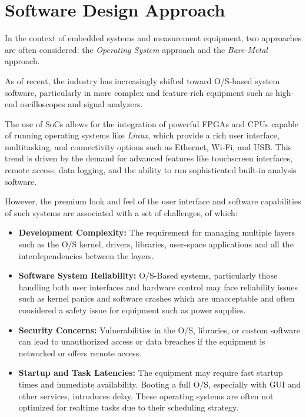 
\section{Software Design Approach}
\label{sec:software-design-approach}

In the context of embedded systems and measurement equipment, two
approaches are often considered: the \emph{Operating System} approach and the
\emph{Bare-Metal} approach.

As of recent, the industry has increasingly shifted toward \acs{O/S}-based
system software, particularly in more complex and feature-rich equipment
such as high-end oscilloscopes and signal analyzers.

The use of \acs{SoC}s allows for the integration of powerful \acs{FPGA}s and
\acs{CPU}s 
capable of running operating systems like \emph{Linux}, which provide a
rich user interface, multitasking, and connectivity
options such as Ethernet, Wi-Fi, and USB.
This trend is driven by the demand for advanced features like touchscreen
interfaces, remote access, data logging, and the ability to run sophisticated
built-in analysis software.

However, the premium look and feel of the user interface and software
capabilities of such systems are associated with a set of challenges, of which:

\begin{itemize}[topsep=8pt,itemsep=4pt,partopsep=4pt, parsep=4pt]
    \item \textbf{Development Complexity:}
    The requirement for managing multiple layers such as the
    \acs{O/S} kernel, drivers, libraries, user-space applications and
    all the interdependencies between the layers.

    \item \textbf{Software System Reliability:}
    \acs{O/S}-Based systems, particularly those handling both user interfaces
    and hardware control may face reliability issues such as kernel panics
    and software crashes which are unacceptable and often
    considered a safety issue for equipment such as power supplies.

    \item \textbf{Security Concerns:}
    Vulnerabilities in the \acs{O/S}, libraries, or custom software can lead to
    unauthorized access or data breaches if the equipment is networked or offers
    remote access.

    \item \textbf{Startup and Task Latencies:}
    The equipment may require fast startup times and immediate availability.
    Booting a full \acs{O/S}, especially with \acs{GUI} and other services,
    introduces delay.
    These operating systems are often not optimized for realtime tasks
    due to their scheduling strategy.

\end{itemize}

